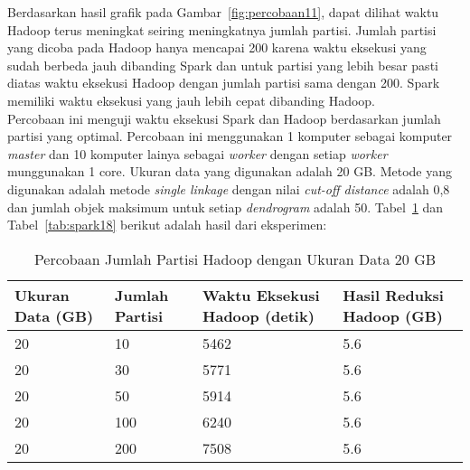 Berdasarkan hasil grafik pada Gambar~\ref{fig:percobaan11}, dapat dilihat waktu Hadoop terus meningkat seiring meningkatnya jumlah partisi. Jumlah partisi yang dicoba pada Hadoop hanya mencapai 200 karena waktu eksekusi yang sudah berbeda jauh dibanding Spark dan untuk partisi yang lebih besar pasti diatas waktu eksekusi Hadoop dengan jumlah partisi sama dengan 200. Spark memiliki waktu eksekusi yang jauh lebih cepat dibanding Hadoop.\\




Percobaan ini menguji waktu eksekusi Spark dan Hadoop berdasarkan jumlah partisi yang optimal. Percobaan ini menggunakan 1 komputer sebagai komputer \textit{master} dan 10 komputer lainya sebagai \textit{worker} dengan setiap \textit{worker} munggunakan 1 core. Ukuran data yang digunakan adalah 20 GB. Metode yang digunakan adalah metode \textit{single linkage} dengan nilai \textit{cut-off distance} adalah 0,8 dan jumlah objek maksimum untuk setiap \textit{dendrogram} adalah 50. Tabel~\ref{tab:spark17} dan Tabel~\ref{tab:spark18} berikut adalah hasil dari eksperimen:





\begin{table}[H] 
	\centering 
	\caption{Percobaan Jumlah Partisi Hadoop dengan Ukuran Data 20 GB}
	\label{tab:spark17}
	\begin{tabular}{|p{3cm}|p{3cm}|p{4cm}|p{4cm}|}
\hline
Ukuran Data (GB) & Jumlah Partisi &  Waktu Eksekusi Hadoop (detik) & Hasil Reduksi Hadoop (GB)\\
\hline
20 & 10 & 5462  & 5.6  \\
\hline
20 & 30 & 5771  & 5.6  \\
\hline
20 & 50 & 5914  & 5.6  \\
\hline
20 & 100 & 6240  & 5.6  \\
\hline
20 & 200 & 7508 & 5.6  \\
\hline


\hline

	\end{tabular} 
\end{table}




